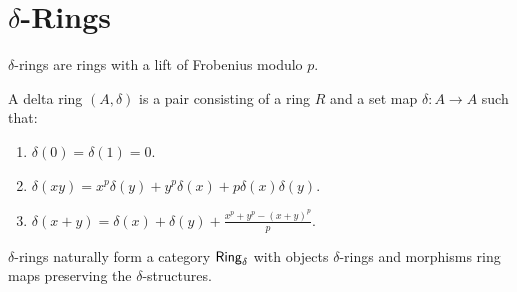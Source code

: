\section{$\delta$-Rings}\label{sec: delta rings}
$\delta$-rings are rings with a lift of Frobenius modulo $p$. 
\begin{definition}\label{def: delta rings}
    A delta ring $(A,\delta)$ is a pair consisting of a ring $R$ and a set map $\delta:A\to A$ such that:
    \begin{enumerate}[label=(\roman*)]
        \item $\delta(0)=\delta(1)=0$. 
        \item $\delta(xy)=x^{p}\delta(y)+y^{p}\delta(x)+p\delta(x)\delta(y)$. 
        \item $\delta(x+y)=\delta(x)+\delta(y)+\frac{x^{p}+y^{p}-(x+y)^{p}}{p}. $
    \end{enumerate}
\end{definition}
$\delta$-rings naturally form a category $\mathsf{Ring}_{\delta}$ with objects $\delta$-rings and morphisms ring maps preserving the $\delta$-structures. 

